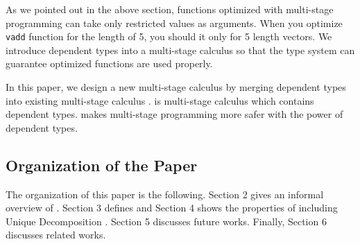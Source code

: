 As we pointed out in the above section,
functions optimized with multi-stage programming can take only restricted values as arguments.
When you optimize \verb|vadd| function for the length of 5, you should it only for 5 length vectors.
We introduce dependent types into a multi-stage calculus
so that the type system can guarantee optimized functions are used properly.

In this paper, we design a new multi-stage calculus \LMD by 
merging dependent types into existing multi-stage calculus \LTP\cite{Hanada2014}.
\LMD is multi-stage calculus which contains dependent types.
\LMD makes multi-stage programming more safer  with the power of dependent types.


\subsection{Organization of the Paper}

The organization of this paper is the following.
Section 2 gives an informal overview of \LMD.
Section 3 defines \LMD and
Section 4 shows the properties of \LMD including Unique Decomposition .
Section 5 discusses future works.
Finally, Section 6 discusses related works.
